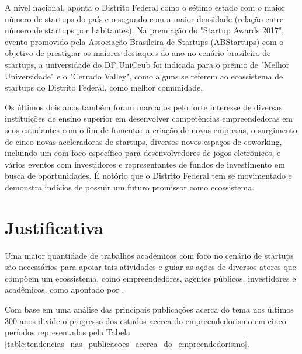 A nível nacional,  aponta o Distrito Federal como o sétimo estado com o maior número de startups do país e o segundo com a maior densidade (relação entre número de startups por habitantes). Na premiação do "Startup Awards 2017", evento promovido pela Associação Brasileira de Startups (ABStartups) com o objetivo de prestigiar os maiores destaques do ano no cenário brasileiro de startups, a universidade do DF UniCeub foi indicada para o prêmio de "Melhor Universidade" e o "Cerrado Valley", como alguns se referem ao ecossistema de startups do Distrito Federal, como melhor comunidade. 

Os últimos dois anos também foram marcados pelo forte interesse de diversas instituições de ensino superior em desenvolver competências empreendedoras em seus estudantes com o fim de fomentar a criação de novas empresas, o surgimento de cinco novas aceleradoras de startups, diversos novos espaços de coworking, incluindo um com foco específico para desenvolvedores de jogos eletrônicos, e vários eventos com investidores e representantes de fundos de investimento em busca de oportunidades. É notório que o Distrito Federal tem se movimentado e demonstra indícios de possuir um futuro promissor como ecossistema.

\section{Justificativa}
\label{section:justificativa}

Uma maior quantidade de trabalhos acadêmicos com foco no cenário de startups são necessários para apoiar tais atividades e guiar as ações de diversos atores que compõem um ecossistema, como empreendedores, agentes públicos, investidores e acadêmicos, como apontado por .

Com base em uma análise das principais publicações acerca do tema nos últimos 300 anos  divide o progresso dos estudos acerca do empreendedorismo em cinco períodos representados pela Tabela \ref{table:tendencias_nas_publicacoes_acerca_do_empreendedorismo}.

